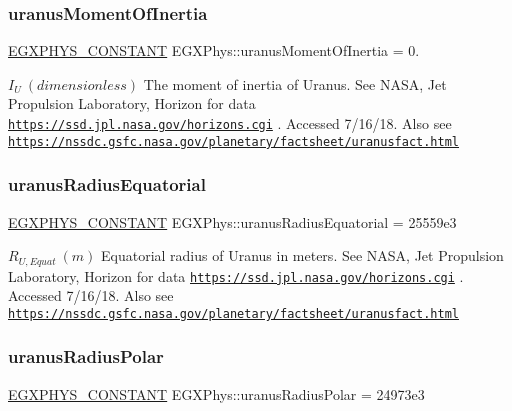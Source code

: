 \subsubsection{\texorpdfstring{uranus\+Moment\+Of\+Inertia}{uranusMomentOfInertia}}
{\footnotesize\ttfamily \mbox{\hyperlink{group___e_g_x_phys-_constants-_macros_ga76980d288494ce1714c9ac68a95ba702}{E\+G\+X\+P\+H\+Y\+S\+\_\+\+C\+O\+N\+S\+T\+A\+NT}} E\+G\+X\+Phys\+::uranus\+Moment\+Of\+Inertia = 0.}

$ I_{U} \ (dimensionless)$ The moment of inertia of Uranus. See N\+A\+SA, Jet Propulsion Laboratory, Horizon for data \href{https://ssd.jpl.nasa.gov/horizons.cgi}{\tt https\+://ssd.\+jpl.\+nasa.\+gov/horizons.\+cgi} . Accessed 7/16/18. Also see \href{https://nssdc.gsfc.nasa.gov/planetary/factsheet/uranusfact.html}{\tt https\+://nssdc.\+gsfc.\+nasa.\+gov/planetary/factsheet/uranusfact.\+html} \mbox{\label{group___e_g_x_phys-_constants-_astrophysics-_solar_system-_uranus-_bulk_ga8610758fe64ac622528c0b951dd90e23}} 
\subsubsection{\texorpdfstring{uranus\+Radius\+Equatorial}{uranusRadiusEquatorial}}
{\footnotesize\ttfamily \mbox{\hyperlink{group___e_g_x_phys-_constants-_macros_ga76980d288494ce1714c9ac68a95ba702}{E\+G\+X\+P\+H\+Y\+S\+\_\+\+C\+O\+N\+S\+T\+A\+NT}} E\+G\+X\+Phys\+::uranus\+Radius\+Equatorial = 25559e3}

$R_{U,Equat} \ (m)$ Equatorial radius of Uranus in meters. See N\+A\+SA, Jet Propulsion Laboratory, Horizon for data \href{https://ssd.jpl.nasa.gov/horizons.cgi}{\tt https\+://ssd.\+jpl.\+nasa.\+gov/horizons.\+cgi} . Accessed 7/16/18. Also see \href{https://nssdc.gsfc.nasa.gov/planetary/factsheet/uranusfact.html}{\tt https\+://nssdc.\+gsfc.\+nasa.\+gov/planetary/factsheet/uranusfact.\+html} \mbox{\label{group___e_g_x_phys-_constants-_astrophysics-_solar_system-_uranus-_bulk_ga91b85385fee1afe5a4df54e4b4cbe7ad}} 
\subsubsection{\texorpdfstring{uranus\+Radius\+Polar}{uranusRadiusPolar}}
{\footnotesize\ttfamily \mbox{\hyperlink{group___e_g_x_phys-_constants-_macros_ga76980d288494ce1714c9ac68a95ba702}{E\+G\+X\+P\+H\+Y\+S\+\_\+\+C\+O\+N\+S\+T\+A\+NT}} E\+G\+X\+Phys\+::uranus\+Radius\+Polar = 24973e3}

